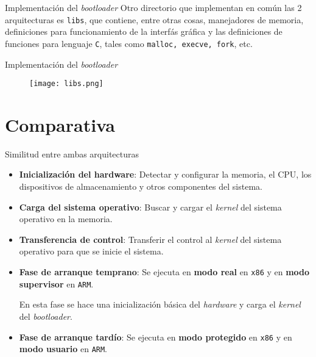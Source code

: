 \begin{frame}{Implementación del \textit{bootloader}}
	Otro directorio que implementan en común las 2 arquitecturas es \texttt{libs}, que contiene, entre otras cosas, manejadores de memoria, definiciones para funcionamiento de la interfás gráfica y las definiciones de funciones para lenguaje \texttt{C}, tales como \texttt{malloc, execve, fork}, etc.
\end{frame}

\begin{frame}{Implementación del \textit{bootloader}}
	\begin{figure}[ht]
		\centering
		\texttt{[image: libs.png]}
	\end{figure}
\end{frame}



\section{Comparativa}
\begin{frame}{Similitud entre ambas arquitecturas}
	\begin{itemize} \setlength\itemsep{0pt}
		\item \textbf{Inicialización del hardware}: Detectar y configurar la memoria, el CPU, los dispositivos de almacenamiento y otros componentes del sistema.
		
		\item \textbf{Carga del sistema operativo}: Buscar y cargar el \textit{kernel} del sistema operativo en la memoria.
		
		\item \textbf{Transferencia de control}: Transferir el control al \textit{kernel} del sistema operativo para que se inicie el sistema.
		
		\item \textbf{Fase de arranque temprano}: Se ejecuta en \textbf{modo real} en \texttt{x86} y en \textbf{modo supervisor} en \texttt{ARM}. 
		
		En esta fase se hace una inicialización básica del \textit{hardware} y carga el \textit{kernel} del \textit{bootloader}.
		
		\item \textbf{Fase de arranque tardío}: Se ejecuta en \textbf{modo protegido} en \texttt{x86} y en \textbf{modo usuario} en \texttt{ARM}. 
	\end{itemize}
\end{frame}



